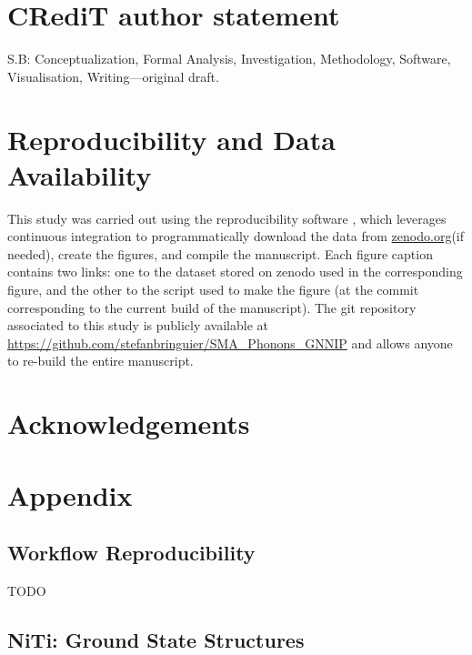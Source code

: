 \documentclass[preprint,colorlinks=true,linkcolor=black,citecolor=black]{elsarticle}
\begin{document}
 

\section*{CR\lowercase{e}d\lowercase{i}T author statement}

S.B: Conceptualization, Formal Analysis, Investigation, Methodology,
Software, Visualisation, Writing---original draft.

\section*{Reproducibility and Data Availability}
This study was carried out using the reproducibility software
\href{https://github.com/showyourwork/showyourwork}{\showyourwork}\cite{Luger2021},
which leverages continuous integration to programmatically download
the data from \href{https://zenodo.org/}{zenodo.org}(if needed),
create the figures, and compile the manuscript. Each figure caption
contains two links: one to the dataset stored on zenodo used in the
corresponding figure, and the other to the script used to make the
figure (at the commit corresponding to the current build of the
manuscript). The git repository associated to this study is publicly
available at
\url{https://github.com/stefanbringuier/SMA_Phonons_GNNIP} and allows
anyone to re-build the entire manuscript.\par

\section*{Acknowledgements}

\newpage
\appendix
\section{Appendix}
\subsection{Workflow Reproducibility}
\label{sec:appx_reproduce}

TODO

\subsection{NiTi: Ground State Structures}
\label{sec:opt_structures}

\end{document}
